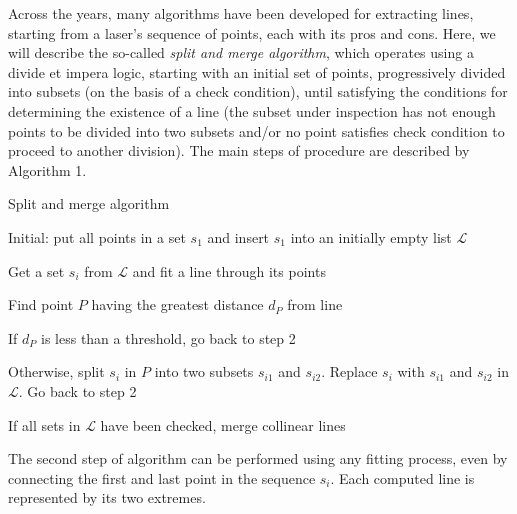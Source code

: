\documentclass[a4paper, onecolumn]{report}
\begin{document}
Across the years, many algorithms have been developed for extracting lines, starting from a laser's sequence of points, each with its pros and cons. Here, we will describe the so-called \emph{split and merge algorithm}, which operates using a divide et impera logic, starting with an initial set of points, progressively divided into subsets (on the basis of a check condition), until satisfying the conditions for determining the existence of a line (the subset under inspection has not enough points to be divided into two subsets and/or no point satisfies check condition to proceed to another division).
The main steps of procedure are described by Algorithm 1.
\begin{algorithm}
\caption{Split and merge algorithm}\label{euclid}
\begin{algorithmic}[1]
\item{Initial: put all points in a set $s_1$ and insert $s_1$ into an initially empty list $\mathcal{L}$}
\item{Get a set $s_i$ from $\mathcal{L}$ and fit a line through its points}
\item{Find point $P$ having the greatest distance $d_P$ from line}
\item{If $d_P$ is less than a threshold, go back to step 2}
\item{Otherwise, split $s_i$ in $P$ into two subsets $s_{i1}$ and $s_{i2}$. Replace $s_i$ with $s_{i1}$ and $s_{i2}$ in $\mathcal{L}$. Go back to step 2}
\item{If all sets in $\mathcal{L}$ have been checked, merge collinear lines}
\end{algorithmic}
\end{algorithm}
The second step of algorithm can be performed using any fitting process, even by connecting the first and last point in the sequence $s_i$. Each computed line is represented by its two extremes.
\end{document}
